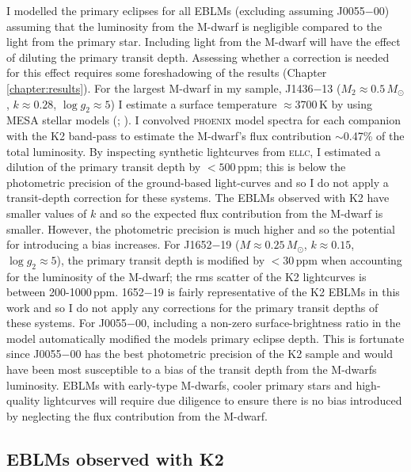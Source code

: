  I modelled the primary eclipses for all EBLMs (excluding  assuming J0055$-$00) assuming that the luminosity from the M-dwarf is negligible compared to the light from the primary star. Including light from the M-dwarf will have the effect of diluting the primary transit depth. Assessing whether a correction is needed for this effect requires some foreshadowing of the results (Chapter \ref{chapter:results}). For the largest M-dwarf in my sample, J1436$-$13 ($M_2 \approx 0.5\,M_\odot$, $k \approx 0.28$, $\log g_2 \approx 5$) I estimate a surface temperature $\approx$3700\,K by using MESA stellar models (\citealt{2016ApJ...823..102C}; \citealt{2016ApJS..222....8D}). I convolved \textsc{phoenix} model spectra \citep{2013A&A...553A...6H} for each companion with the K2 band-pass to estimate the M-dwarf's flux contribution  $\sim$0.47\% of the total luminosity. By inspecting synthetic lightcurves from \textsc{ellc}, I estimated a dilution of the primary transit depth by $< 500$\,ppm; this is below the photometric precision of the ground-based light-curves and so I do not apply a transit-depth correction for these systems. The EBLMs observed with K2 have smaller values of $k$ and so the expected flux contribution from the M-dwarf is smaller. However, the photometric precision is much higher and so the potential for introducing a bias increases. For J1652$-$19 ($M \approx 0.25\,M_\odot$, $k \approx 0.15$, $\log g_2 \approx 5$), the primary transit depth is modified by $<30$\,ppm when accounting for the luminosity of the M-dwarf; the rms scatter of the K2 lightcurves is between 200-1000\,ppm. 1652$-$19 is fairly representative of the K2 EBLMs in this work and so I do not apply any corrections for the primary transit depths of these systems.  For J0055$-$00, including a non-zero surface-brightness ratio in the model automatically modified the models primary eclipse depth. This is fortunate since J0055$-$00 has the best photometric precision of the K2 sample and would have been most susceptible to a bias of the transit depth from the M-dwarfs luminosity. EBLMs with early-type M-dwarfs, cooler primary stars and high-quality lightcurves will require due diligence to ensure there is no bias introduced by neglecting the flux contribution from the M-dwarf. 

 
 
 
 \subsection{EBLMs observed with K2}
 
